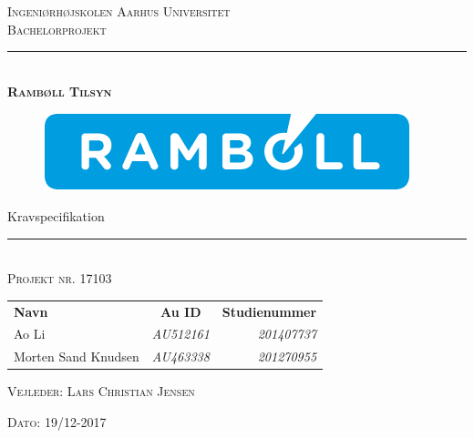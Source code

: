 \newcommand{\HRule}{\rule{\linewidth}{0.1mm}} %
\thispagestyle{empty}
\begin{center}
	\vspace{3cm}
	\textsc{\LARGE Ingeniørhøjskolen Aarhus Universitet}\\[1.5cm] %
	
	\textsc{\large Bachelorprojekt}\\[2.5 cm] 
	
	\HRule \\[0.8cm]
	{\huge \bfseries \textsc{Rambøll Tilsyn}} 
		\begin{figure}[h!]
		\centering
		\includegraphics[width=0.7\linewidth]{Forside/Logo}
	\end{figure}

	{\LARGE Kravspecifikation} \\[0.4cm]
	\HRule \\[1.5cm]
	
	\textsc{\large Projekt nr. 17103}\\
	\vspace{0.5 in}
	\begin{center}
		\begin{tabular}{l c r}
			\textbf{Navn} & \textbf{Au ID} & \textbf{Studienummer} \\
			Ao Li & \textsl{AU512161} & \textsl{201407737}    \\
			Morten Sand Knudsen & \textsl{AU463338} & \textsl{201270955}  \\
		\end{tabular}
	\end{center}
	\vspace{0.5 in}
	
	\textsc{\large Vejleder: Lars Christian Jensen}
	\vspace{0.5 in}
	
	\textsc{\large Dato: 19/12-2017}\\
	\vfill %
	
\end{center} %

\clearpage

\newpage